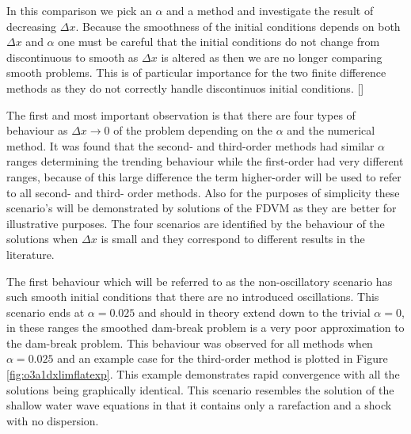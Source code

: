 \documentclass[SingleSpace,12pt,Proceedings]{Serre_ASCE}
\begin{document}
In this comparison we pick an $\alpha$ and a method and investigate the result of decreasing $\Delta x$. Because the smoothness of the initial conditions depends on both $\Delta x$ and $\alpha$ one must be careful that the initial conditions do not change from discontinuous to smooth as $\Delta x$ is altered as then we are no longer comparing smooth problems. This is of particular importance for the two finite difference methods as they do not correctly handle discontinuos initial conditions. [] 

The first and most important observation is that there are four types of behaviour as $\Delta x \rightarrow 0$ of the problem depending on the $\alpha$ and the numerical method. It was found that the second- and third-order methods had similar $\alpha$ ranges determining the trending behaviour while the first-order had very different ranges, because of this large difference the term higher-order will be used to refer to all second- and third- order methods. Also for the purposes of simplicity these scenario's will be demonstrated by solutions of the FDVM as they are better for illustrative purposes. The four scenarios are identified by the behaviour of the solutions when $\Delta x$ is small and they correspond to different results in the literature. 

The first behaviour which will be referred to as the non-oscillatory scenario has such smooth initial conditions that there are no introduced oscillations. This scenario ends at $\alpha = 0.025$ and should in theory extend down to the trivial $\alpha = 0$, in these ranges the smoothed dam-break problem is a very poor approximation to the dam-break problem. This behaviour was observed for all methods when $\alpha = 0.025$ and an example case for the third-order method is plotted in Figure \ref{fig:o3a1dxlimflatexp}. This example demonstrates rapid convergence with all the solutions being graphically identical. This scenario resembles the solution of the shallow water wave equations in that it contains only a rarefaction and a shock with no dispersion. 
\end{document}

